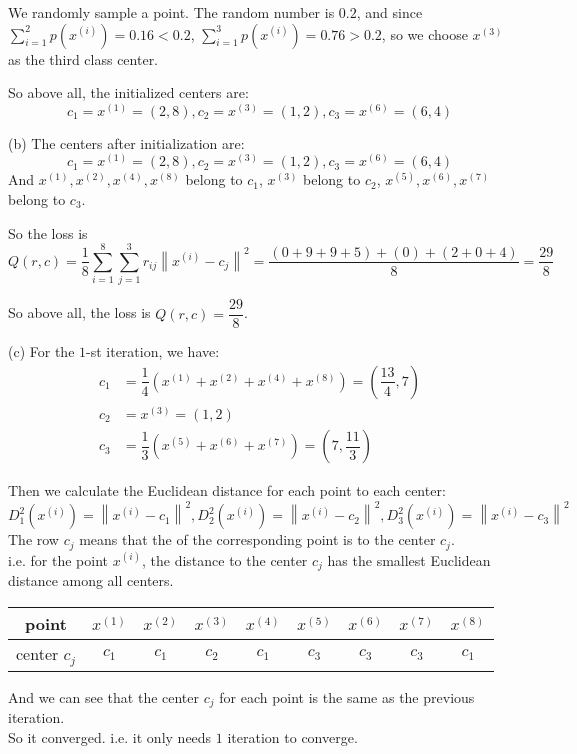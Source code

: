We randomly sample a point. The random number is $0.2$, and since $\sum\limits_{i=1}^2p\left(x^{(i)}\right)=0.16<0.2$, $\sum\limits_{i=1}^3p\left(x^{(i)}\right)=0.76>0.2$, so we choose $x^{(3)}$ as the third class center.

So above all, the initialized centers are:
$$c_1=x^{(1)}=(2,8), c_2=x^{(3)}=(1,2), c_3=x^{(6)}=(6,4)$$

(b) The centers after initialization are:
$$c_1=x^{(1)}=(2,8), c_2=x^{(3)}=(1,2), c_3=x^{(6)}=(6,4)$$
And $x^{(1)},x^{(2)},x^{(4)},x^{(8)}$ belong to $c_1$, $x^{(3)}$ belong to $c_2$, $x^{(5)},x^{(6)},x^{(7)}$ belong to $c_3$.

So the loss is
$$Q(r,c)=\dfrac{1}{8}\sum\limits_{i=1}^8\sum\limits_{j=1}^3r_{ij}\left\|x^{(i)}-c_j\right\|^2=\dfrac{(0+9+9+5)+(0)+(2+0+4)}{8}=\dfrac{29}{8}$$

So above all, the loss is $Q(r,c)=\dfrac{29}{8}$.

(c) For the $1$-st iteration, we have:
\begin{align*}
c_1 &= \dfrac{1}{4}(x^{(1)}+x^{(2)}+x^{(4)}+x^{(8)})=\left(\dfrac{13}{4},7\right) \\
c_2 &= x^{(3)}=(1,2) \\
c_3 &= \dfrac{1}{3}(x^{(5)}+x^{(6)}+x^{(7)})=\left(7,\dfrac{11}{3}\right)
\end{align*}

Then we calculate the Euclidean distance for each point to each center:
$$D_1^2\left(x^{(i)}\right)=\left\|x^{(i)}-c_1\right\|^2, D_2^2\left(x^{(i)}\right)=\left\|x^{(i)}-c_2\right\|^2, D_3^2\left(x^{(i)}\right)=\left\|x^{(i)}-c_3\right\|^2$$
The row $c_j$ means that the of the corresponding point is to the center $c_j$. \\
i.e. for the point $x^{(i)}$, the distance to the center $c_j$ has the smallest Euclidean distance among all centers.
\begin{table*}[h]
    \centering
    \begin{tabular}{|c|c|c|c|c|c|c|c|c|}
	\hline
	point & $x^{(1)}$ & $x^{(2)}$ & $x^{(3)}$ & $x^{(4)}$ & $x^{(5)}$ & $x^{(6)}$ & $x^{(7)}$ & $x^{(8)}$ \\
	\hline
	center $c_j$ & $c_1$ & $c_1$ & $c_2$ & $c_1$ & $c_3$ & $c_3$ & $c_3$ & $c_1$ \\
	\hline
    \end{tabular}
\end{table*}

And we can see that the center $c_j$ for each point is the same as the previous iteration. \\
So it converged. i.e. it only needs $1$ iteration to converge.

